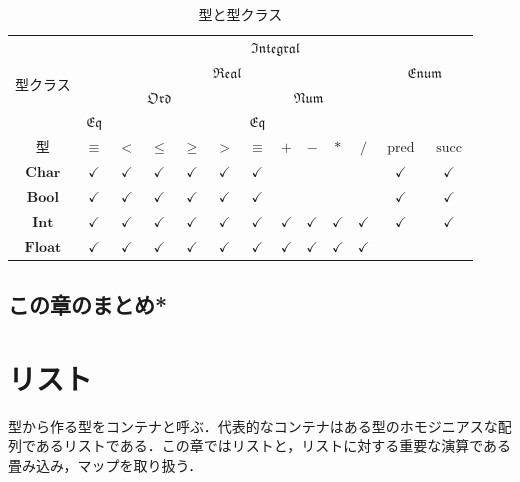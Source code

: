 \documentclass[a4paper]{jsbook}
\newenvironment{leader}{\begingroup}{\endgroup}
\newcommand{\mType}[1]{\mathbf{#1}}
\newcommand{\mBoolType}{\mType{Bool}}
\newcommand{\mCharType}{\mType{Char}}
\newcommand{\mIntType}{\mType{Int}}
\newcommand{\mFloatType}{\mType{Float}}
\newcommand{\mSpecialTypeClass}[1]{\mathfrak{#1}} %
\newcommand{\mEqTypeClass}{\mSpecialTypeClass{Eq}}
\newcommand{\mOrdTypeClass}{\mSpecialTypeClass{Ord}}
\newcommand{\mNumTypeClass}{\mSpecialTypeClass{Num}}
\newcommand{\mRealTypeClass}{\mSpecialTypeClass{Real}}
\newcommand{\mEnumTypeClass}{\mSpecialTypeClass{Enum}}
\newcommand{\mIntegralTypeClass}{\mSpecialTypeClass{Integral}}
\DeclareMathOperator{\mathPred}{pred}
\DeclareMathOperator{\mathSucc}{succ}
\begin{document}
\begin{table}
\caption{型と型クラス}
\label{tab:type-and-typeclass}
\begin{center}
\begin{tabular}{||c||c|c|c|c|c|c|c|c|c|c|c|c||}
\hline
\multirow{4}{*}{型クラス}
    &\multicolumn{12}{|c||}{$\mIntegralTypeClass$}\\
\cline{2-13}
\multirow{3}{*}{}
    &\multicolumn{10}{|c|}{$\mRealTypeClass$}
    &\multicolumn{2}{|c||}{$\mEnumTypeClass$}\\
\cline{2-11}
\multirow{2}{*}{}
    &\multicolumn{5}{|c|}{$\mOrdTypeClass$}
    &\multicolumn{5}{|c|}{$\mNumTypeClass$}
    &\multicolumn{2}{|c||}{ }\\
\cline{2-2}\cline{7-7}
{ }
    &$\mEqTypeClass$
    &\multicolumn{4}{|c|}{ }
    &$\mEqTypeClass$
    &\multicolumn{4}{|c|}{ }
    &\multicolumn{2}{|c||}{ }\\
\hline\hline
型
    &$\equiv$
    &$<$
    &$\le$
    &$\ge$
    &$>$
    &$\equiv$
    &$+$
    &$-$
    &$*$
    &$/$
    &$\mathPred$
    &$\mathSucc$\\
\hline
$\mCharType$
    &$\checkmark$
    &$\checkmark$
    &$\checkmark$
    &$\checkmark$
    &$\checkmark$
    &$\checkmark$
    &
    &
    &
    &
    &$\checkmark$
    &$\checkmark$\\
\hline
$\mBoolType$
    &$\checkmark$
    &$\checkmark$
    &$\checkmark$
    &$\checkmark$
    &$\checkmark$
    &$\checkmark$
    &
    &
    &
    &
    &$\checkmark$
    &$\checkmark$\\
\hline
$\mIntType$
    &$\checkmark$
    &$\checkmark$
    &$\checkmark$
    &$\checkmark$
    &$\checkmark$
    &$\checkmark$
    &$\checkmark$
    &$\checkmark$
    &$\checkmark$
    &$\checkmark$
    &$\checkmark$
    &$\checkmark$\\
\hline
$\mFloatType$
    &$\checkmark$
    &$\checkmark$
    &$\checkmark$
    &$\checkmark$
    &$\checkmark$
    &$\checkmark$
    &$\checkmark$
    &$\checkmark$
    &$\checkmark$
    &$\checkmark$
    &
    &\\
\hline
\end{tabular}
\end{center}
\end{table}

\section{この章のまとめ*}


\chapter{リスト}
\begin{leader}
型から作る型をコンテナと呼ぶ．代表的なコンテナはある型のホモジニアスな配列であるリストである．この章ではリストと，リストに対する重要な演算である畳み込み，マップを取り扱う．
\end{leader}
\end{document}
